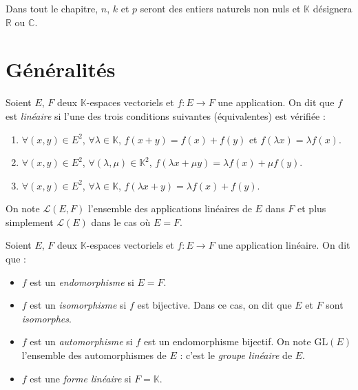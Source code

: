 \documentclass[a4paper,10pt]{report}
\begin{document}


\noindent Dans tout le chapitre, $n$, $k$ et $p$ seront des entiers naturels non nuls et $\mathbb{K}$ désignera $\mathbb{R}$ ou $\mathbb{C}$.

 \section{Généralités}
 
 \begin{defin} Soient $E$, $F$ deux $\mathbb{K}$-espaces vectoriels et $f : E \rightarrow F$ une application. On dit que $f$ est \textit{linéaire} si l'une des trois conditions suivantes (équivalentes) est vérifiée :

\begin{enumerate}
\item $\forall (x,y) \in E^2$, $\forall \lambda \in \mathbb{K}$, $f(x+y) = f(x)+f(y)$ et $f(\lambda x) = \lambda f(x)$.
\item $\forall (x,y) \in E^2$, $\forall (\lambda,\mu) \in \mathbb{K}^2$, $f(\lambda x + \mu y) = \lambda f(x) + \mu f(y)$. 
\item $\forall (x,y) \in E^2$, $\forall \lambda \in \mathbb{K}$, $f(\lambda x + y) = \lambda f(x) +  f(y)$. 
\end{enumerate}
On note $\mathcal{L}(E,F)$ l'ensemble des applications linéaires de $E$ dans $F$ et plus simplement $\mathcal{L}(E)$ dans le cas où $E=F$.
\end{defin}

\begin{defin} Soient $E$, $F$ deux $\mathbb{K}$-espaces vectoriels et $f : E \rightarrow F$ une application linéaire. On dit que :

\begin{itemize}
\item $f$ est un \textit{endomorphisme} si $E=F$.
\item $f$ est un \textit{isomorphisme} si $f$ est bijective. Dans ce cas, on dit que $E$ et $F$ sont \textit{isomorphes}.
\item $f$ est un \textit{automorphisme} si $f$ est un endomorphisme bijectif. On note $\textrm{GL}(E)$ l'ensemble des automorphismes de $E$ : c'est le \textit{groupe linéaire} de $E$.
\item $f$ est une \textit{forme linéaire} si $F = \mathbb{K}$.
\end{itemize}
\end{defin}
\end{document}
